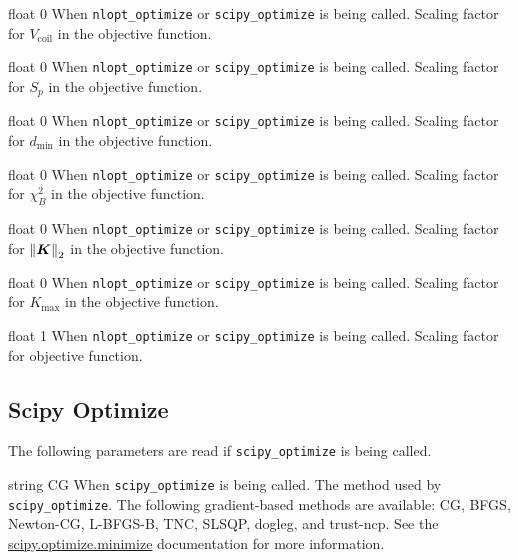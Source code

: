 \myhrule

{float}
{0}
{When \texttt{nlopt\_optimize} or \texttt{scipy\_optimize} is being called.}
{Scaling factor for $V_{\text{coil}}$ in the objective function.}

\myhrule

{float}
{0}
{When \texttt{nlopt\_optimize} or \texttt{scipy\_optimize} is being called.}
{Scaling factor for $S_p$ in the objective function.}

\myhrule

{float}
{0}
{When \texttt{nlopt\_optimize} or \texttt{scipy\_optimize} is being called.}
{Scaling factor for $d_{\text{min}}$ in the objective function.}

\myhrule

{float}
{0}
{When \texttt{nlopt\_optimize} or \texttt{scipy\_optimize} is being called.}
{Scaling factor for $\chi^2_B$ in the objective function.}

\myhrule

{float}
{0}
{When \texttt{nlopt\_optimize} or \texttt{scipy\_optimize} is being called.}
{Scaling factor for $\norm{\bm{K}}_2$ in the objective function.}

\myhrule

{float}
{0}
{When \texttt{nlopt\_optimize} or \texttt{scipy\_optimize} is being called.}
{Scaling factor for $K_{\max}$ in the objective function.}

\myhrule

{float}
{1}
{When \texttt{nlopt\_optimize} or \texttt{scipy\_optimize} is being called.}
{Scaling factor for objective function.}

\myhrule

\subsection{Scipy Optimize}

The following parameters are read if \texttt{scipy\_optimize} is being called. 

{string}
{CG}
{When \texttt{scipy\_optimize} is being called.}
{The method used by \texttt{scipy\_optimize}. The following gradient-based methods are available: CG, BFGS, Newton-CG, L-BFGS-B, TNC, SLSQP, dogleg, and trust-ncp. See the \\
\href{https://docs.scipy.org/doc/scipy/reference/generated/scipy.optimize.minimize.html}{scipy.optimize.minimize} documentation for more information.}

